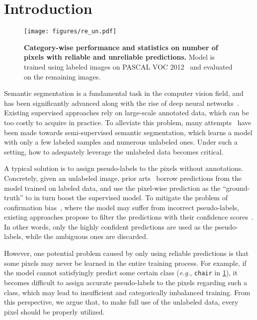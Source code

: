 \documentclass[10pt, twocolumn, letterpaper]{article}
\begin{document}
\section{Introduction}\label{sec:intro}


\begin{figure}[t]
    \centering
    \texttt{[image: figures/re\_un.pdf]}
    \vspace{-18pt}
    \caption{
        \textbf{Category-wise performance and statistics on number of pixels with reliable and unreliable predictions.}
Model is trained using  labeled images on PASCAL VOC 2012~\cite{voc} and evaluated on the remaining  images.
    }
    \label{fig:stats}
    \vspace{-12pt}
\end{figure}


Semantic segmentation is a fundamental task in the computer vision field, and has been significantly advanced along with the rise of deep neural networks~\cite{fcn, unet, pspnet, deeplab}.
Existing supervised approaches rely on large-scale annotated data, which can be too costly to acquire in practice.
To alleviate this problem, many attempts~\cite{st++, cps, chen2021semisupervised, alonso2021semi, french2019semi, cct, ael, pc2seg} have been made towards semi-supervised semantic segmentation, which learns a model with only a few labeled samples and numerous unlabeled ones.
Under such a setting, how to adequately leverage the unlabeled data becomes critical.


A typical solution is to assign pseudo-labels to the pixels without annotations.
Concretely, given an unlabeled image, prior arts~\cite{lee2013pseudo, xie2020self} borrow predictions from the model trained on labeled data, and use the pixel-wise prediction as the ``ground-truth'' to in turn boost the supervised model.
To mitigate the problem of confirmation bias~\cite{arazo2020pseudo}, where the model may suffer from incorrect pseudo-labels, existing approaches propose to filter the predictions with their confidence scores~\cite{st++, pseudoseg, zuo2021self, dash}.
In other words, only the highly confident predictions are used as the pseudo-labels, while the ambiguous ones are discarded.


However, one potential problem caused by only using reliable predictions is that some pixels may never be learned in the entire training process.
For example, if the model cannot satisfyingly predict some certain class (\textit{e.g.}, \texttt{chair} in \cref{fig:stats}), it becomes difficult to assign accurate pseudo-labels to the pixels regarding such a class, which may lead to insufficient and categorically imbalanced training.
From this perspective, we argue that, to make full use of the unlabeled data, every pixel should be properly utilized.
\end{document}
